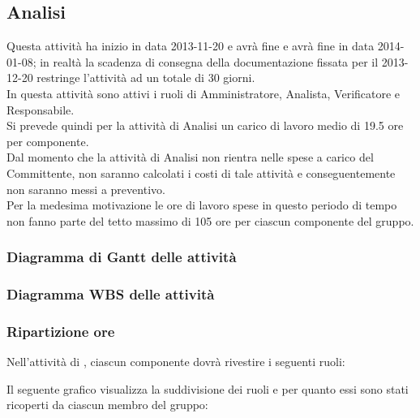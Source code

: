 \subsection{Analisi}
Questa attività ha inizio in data 2013-11-20 e avrà fine e avrà fine in data 2014-01-08; in realtà la scadenza di consegna della documentazione fissata per il 2013-12-20 restringe l'attività ad un totale di 30 giorni.\\
In questa attività sono attivi i ruoli di Amministratore, Analista, Verificatore e Responsabile.\\
Si prevede quindi per la attività di Analisi un carico di lavoro medio di 19.5 ore per componente.\\
Dal momento che la attività di Analisi non rientra nelle spese a carico del Committente, non saranno calcolati i costi di tale attività e conseguentemente non saranno messi a preventivo.\\
Per la medesima motivazione le ore di lavoro spese in questo periodo di tempo non fanno parte del tetto massimo di 105 ore per ciascun componente del gruppo.

\subsubsection{Diagramma di Gantt delle attività}

\newpage
\subsubsection{Diagramma WBS delle attività}

\newpage
\subsubsection{Ripartizione ore}

\newpage
Nell'attività di , ciascun componente dovrà rivestire i seguenti ruoli:

Il seguente grafico visualizza la suddivisione dei ruoli e per quanto essi sono stati ricoperti da ciascun membro del gruppo:
